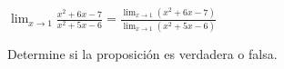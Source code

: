 \item $\displaystyle \lim_{x \to 1} \frac{x^2+6x-7}{x^2+5x-6} = \frac{\lim_{x \to 1} (x^2+6x-7)}{\lim_{x \to 1} (x^2+5x-6)}$
\par
Determine si la proposición es verdadera o falsa.

